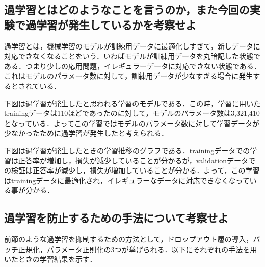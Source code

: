 \documentclass[uplatex,titlepage]{jsarticle}
\newif\iffigure
\begin{document}
\subsection{過学習とはどのようなことを言うのか，また今回の実験で過学習が発生しているかを考察せよ}
過学習とは，機械学習のモデルが訓練用データに最適化しすぎて，新しデータに対応できなくなることをいう．いわばモデルが訓練用データを丸暗記した状態である．つまり少しの応用問題，イレギュラーデータに対応できない状態である．これはモデルのパラメータ数に対して，訓練用データが少なすぎる場合に発生するとされている．\par
下図は過学習が発生したと思われる学習のモデルである．この時，学習に用いたtrainingデータは110ほどであったのに対して，モデルのパラメータ数は3,321,410となっている．よってこの学習ではモデルのパラメータ数に対して学習データが少なかったために過学習が発生したと考えられる．
\iffigure
\begin{figure}[H]%
    \begin{center}
    \texttt{[image: overfit\_model.png]} 
    \caption{過学習が発生した時のモデル}
    \end{center}
\end{figure}
\fi

下図は過学習が発生したときの学習推移のグラフである．trainingデータでの学習は正答率が増加し，損失が減少していることが分かるが，validationデータでの検証は正答率が減少し，損失が増加していることが分かる．よって，この学習はtrainingデータに最適化され，イレギュラーなデータに対応できなくなっている事が分かる．
\iffigure
\begin{figure}[H]
\begin{minipage}{8cm}%
  \begin{center}
   \texttt{[image: ker\_CNN\_acc.png]} \\
   \caption{過学習と考えられる正答率の推移}
  \end{center}
\end{minipage}
\hfill
\begin{minipage}{8cm}%
  \begin{center}
    \texttt{[image: ker\_CNN\_loss.png]} \\
    \caption{過学習と考えられる損失の推移}
  \end{center}
\end{minipage}
\end{figure}
\fi


\subsection{過学習を防止するための手法について考察せよ}
前節のような過学習を抑制するための方法として，ドロップアウト層の導入，バッチ正規化，パラメータ正則化の3つが挙げられる．以下にそれぞれの手法を用いたときの学習結果を示す．
\end{document}
